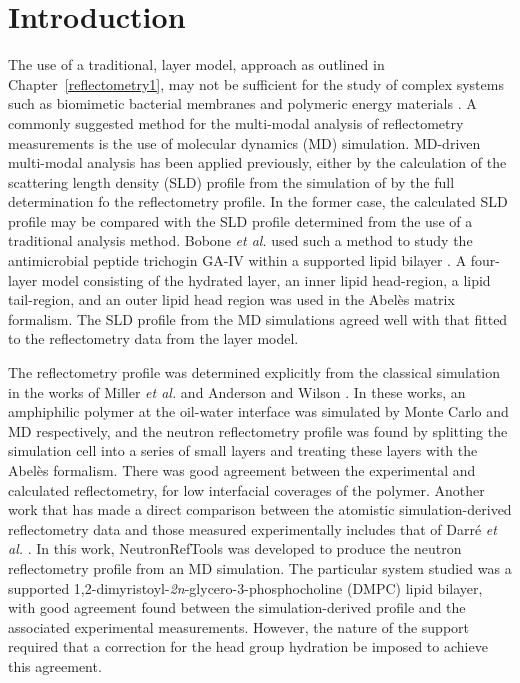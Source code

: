 \section{Introduction}
The use of a traditional, layer model, approach as outlined in Chapter~\ref{reflectometry1}, may not be sufficient for the study of complex systems such as biomimetic bacterial membranes \cite{barker_neutron_2016} and polymeric energy materials \cite{khodakarimi_x-ray_2016}.
A commonly suggested method for the multi-modal analysis of reflectometry measurements is the use of molecular dynamics (MD) simulation.
MD-driven multi-modal analysis has been applied previously, either by the calculation of the scattering length density (SLD) profile from the simulation of by the full determination fo the reflectometry profile.
In the former case, the calculated SLD profile may be compared with the SLD profile determined from the use of a traditional analysis method.
Bobone \emph{et al.} used such a method to study the antimicrobial peptide trichogin GA-IV within a supported lipid bilayer \cite{bobone_membrane_2013}.
A four-layer model consisting of the hydrated  layer, an inner lipid head-region, a lipid tail-region, and an outer lipid head region was used in the Abel\`{e}s matrix formalism.
The SLD profile from the MD simulations agreed well with that fitted to the reflectometry data from the layer model.

The reflectometry profile was determined explicitly from the classical simulation in the works of Miller \emph{et al.} and Anderson and Wilson \cite{miller_monte_2003,anderson_molecular_2004}.
In these works, an amphiphilic polymer at the oil-water interface was simulated by Monte Carlo and MD respectively, and the neutron reflectometry profile was found by splitting the simulation cell into a series of small layers and treating these layers with the Abel\`{e}s formalism.
There was good agreement between the experimental and calculated reflectometry, for low interfacial coverages of the polymer.
Another work that has made a direct comparison between the atomistic simulation-derived reflectometry data and those measured experimentally includes that of Darr\'{e} \emph{et al.} \cite{darre_molecular_2015}.
In this work, NeutronRefTools was developed to produce the neutron reflectometry profile from an MD simulation.
The particular system studied was a supported 1,2-dimyristoyl-\emph{2n}-glycero-3-phosphocholine (DMPC) lipid bilayer, with good agreement found between the simulation-derived profile and the associated experimental measurements.
However, the nature of the support required that a correction for the head group hydration be imposed to achieve this agreement.

